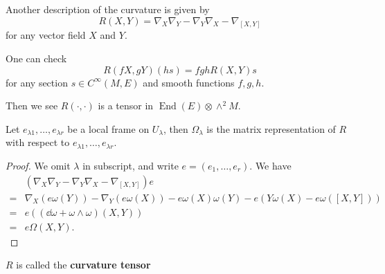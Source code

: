 \documentclass[12pt]{article}
\begin{document}
Another description of the curvature is given by \[
    R(X,Y)=\nabla_X\nabla_Y-\nabla_Y\nabla_X-\nabla_{[X,Y]}
\] for any vector field \(X\) and \(Y\).
\begin{exercise}
    One can check \[
        R(fX,gY)(hs)=fghR(X,Y)s
    \] for any section \(s \in C^\infty(M,E)\) and smooth functions
    \(f,g,h\).
\end{exercise}
Then we see \(R(\cdot ,\cdot )\) is a tensor in
\(\operatorname{End}(E)\otimes \wedge^2M\).

\begin{prop}
    Let \(e_{\lambda 1},\ldots,e_{\lambda r}\) be a local frame on
    \(U_\lambda\), then \(\Omega_\lambda\) is the matrix representation
    of \(R\) with respect to \(e_{\lambda 1},\ldots,e_{\lambda r}\).
\end{prop}
\begin{proof}
    We omit \(\lambda\) in subscript, and write \(e=(e_1,\ldots,e_r)\).
    We have
    \begin{align*}
        &(\nabla_X\nabla_Y-\nabla_Y\nabla_X-\nabla_{[X,Y]})e \\
        =& \nabla_X(e\omega(Y))-\nabla_Y(e\omega(X))-e\omega(X)\omega(Y)
        -e(Y\omega(X)-e\omega([X,Y])) \\
        =&e((\dd{\omega}+\omega\wedge \omega)(X,Y)) \\
        =&e\Omega(X,Y)
    .\end{align*}
\end{proof}
\begin{definition}
    \(R\) is called the \textbf{curvature tensor}
\end{definition}
\end{document}
